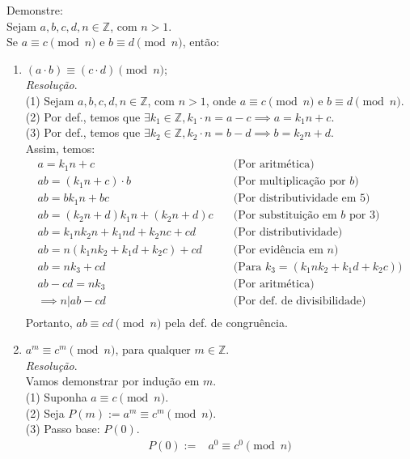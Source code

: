 Demonstre: \\
Sejam $a, b, c, d, n \in \mathbb{Z}$, com $n > 1$. \\
Se $a\equiv c \pmod{n}$ e $b\equiv d \pmod{n}$, então:
\begin{enumerate}
	\item $(a \cdot b)\equiv (c \cdot d) \pmod{n}$; \\
	\emph{Resolução}. \\
	(1) Sejam $a, b, c, d, n \in \mathbb{Z}$, com $n > 1$, onde $a\equiv c \pmod{n}$ e $b\equiv d \pmod{n}$. \\
	(2) Por def., temos que $\exists k_1 \in \mathbb{Z}, k_1 \cdot n = a - c \implies a = k_1n + c$. \\
	(3) Por def., temos que $\exists k_2 \in \mathbb{Z}, k_2 \cdot n = b - d \implies b = k_2n + d$. \\
	Assim, temos:
	\begin{align*}
		a = k_1n + c &\quad \text{(Por aritmética)} \\
		ab = (k_1n + c) \cdot b &\quad \text{(Por multiplicação por $b$)} \\
		ab = bk_1n + bc &\quad \text{(Por distributividade em 5)} \\
		ab = (k_2n + d)k_1n + (k_2n + d)c &\quad \text{(Por substituição em $b$ por 3)} \\
		ab = k_1nk_2n + k_1nd + k_2nc + cd &\quad \text{(Por distributividade)} \\
		ab = n (k_1nk_2 + k_1d + k_2c) + cd &\quad \text{(Por evidência em $n$)} \\
		ab = nk_3 + cd &\quad \text{(Para $k_3 = (k_1nk_2 + k_1d + k_2c)$)} \\
		ab - cd = nk_3 &\quad \text{(Por aritmética)} \\
		\implies n | ab - cd &\quad \text{(Por def. de divisibilidade)} \\
	\end{align*}
	Portanto, $ab \equiv cd \pmod{n}$ pela def. de congruência.
	\item $a^m \equiv c^m \pmod{n}$, para qualquer $m \in \mathbb{Z}$. \\
	\emph{Resolução}. \\
	Vamos demonstrar por indução em $m$. \\
		(1) Suponha $a \equiv c \pmod{n}$. \\
		(2) Seja $P(m) := a^m \equiv c^m \pmod{n}$. \\
		(3) Passo base: $P(0)$.
			\begin{align*}
				P(0) :=& a^0 \equiv c^0 \pmod{n} \\

\end{align*}
\end{enumerate}
